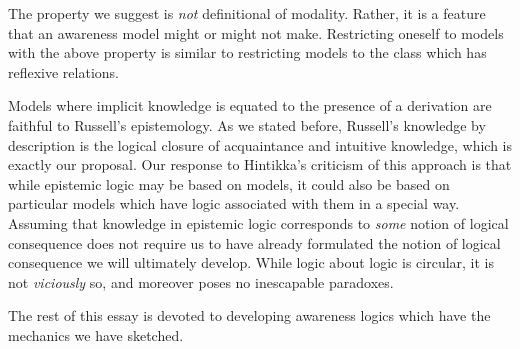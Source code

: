 The property we suggest is \emph{not} definitional of modality.  Rather, it is a
feature that an awareness model might or might not make.  Restricting
oneself to models with the above property is
similar to restricting models to the class which has reflexive
relations.

Models where implicit knowledge is
equated to the presence
of a derivation are faithful to Russell's epistemology.  As we stated
before, Russell's knowledge by description is the logical closure of
acquaintance and intuitive knowledge, which is exactly our proposal.  Our response
to Hintikka's criticism of this approach is that while epistemic logic may be
based on models, it could also be based on particular models
which have logic associated with them in a special way.  Assuming that
knowledge in epistemic logic corresponds to \emph{some} notion of logical consequence
does not require us to have already formulated the notion of logical
consequence we will ultimately
develop.  While logic about logic is circular, it is not
\emph{viciously} so, and moreover poses no inescapable paradoxes.

The rest of this essay is devoted to developing awareness logics which have
the mechanics we have sketched.




